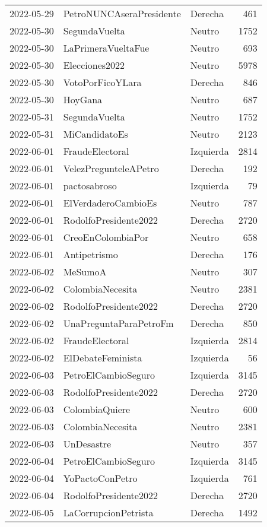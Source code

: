 \begin{longtable}{lllr}
2022-05-29 & PetroNUNCAseraPresidente  & Derecha & 461 \\
2022-05-30 & SegundaVuelta & Neutro & 1752 \\
2022-05-30 & LaPrimeraVueltaFue & Neutro & 693 \\
2022-05-30 & Elecciones2022 & Neutro & 5978 \\
2022-05-30 & VotoPorFicoYLara & Derecha & 846 \\
2022-05-30 & HoyGana & Neutro & 687 \\
2022-05-31 & SegundaVuelta & Neutro & 1752 \\
2022-05-31 & MiCandidatoEs & Neutro & 2123 \\
2022-06-01 & FraudeElectoral & Izquierda & 2814 \\
2022-06-01 & VelezPregunteleAPetro & Derecha & 192 \\
2022-06-01 & pactosabroso & Izquierda & 79 \\
2022-06-01 & ElVerdaderoCambioEs & Neutro & 787 \\
2022-06-01 & RodolfoPresidente2022 & Derecha & 2720 \\
2022-06-01 & CreoEnColombiaPor & Neutro & 658 \\
2022-06-01 & Antipetrismo & Derecha & 176 \\
2022-06-02 & MeSumoA & Neutro & 307 \\
2022-06-02 & ColombiaNecesita & Neutro & 2381 \\
2022-06-02 & RodolfoPresidente2022 & Derecha & 2720 \\
2022-06-02 & UnaPreguntaParaPetroFm & Derecha & 850 \\
2022-06-02 & FraudeElectoral & Izquierda & 2814 \\
2022-06-02 & ElDebateFeminista & Izquierda & 56 \\
2022-06-03 & PetroElCambioSeguro & Izquierda & 3145 \\
2022-06-03 & RodolfoPresidente2022 & Derecha & 2720 \\
2022-06-03 & ColombiaQuiere & Neutro & 600 \\
2022-06-03 & ColombiaNecesita & Neutro & 2381 \\
2022-06-03 & UnDesastre & Neutro & 357 \\
2022-06-04 & PetroElCambioSeguro & Izquierda & 3145 \\
2022-06-04 & YoPactoConPetro & Izquierda & 761 \\
2022-06-04 & RodolfoPresidente2022 & Derecha & 2720 \\
2022-06-05 & LaCorrupcionPetrista & Derecha & 1492 \\

\end{longtable}
